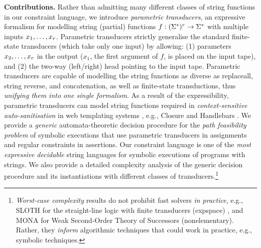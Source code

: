 
\smallskip
\noindent
\textbf{Contributions.} Rather than admitting many different classes of string 
functions in our constraint language, we introduce \emph{parametric 
transducers}, an expressive formalism for modelling string (partial) functions 
$f: (\Sigma^*)^r \to \Sigma^*$ with multiple inputs $x_1,\ldots, 
x_r$. Parametric
transducers strictly generalise the standard finite-state transducers (which take only
one input) by allowing: (1) parameters $x_2,\ldots,x_r$ in the output
($x_1$, the first argument of $f$, is placed on the input tape), 
and (2) the two-way (left/right) head pointing to the input tape. 
Parametric transducers are capable of modelling the string functions as 
diverse as replaceall, string reverse, and concatenation, as well as finite-state transductions, thus \emph{unifying them into one single formalism}.
As a result of the expressibility, parametric transducers can model string functions required in \emph{context-sensitive
auto-sanitisation} in web templating systems \cite{SSS11}, e.g., Closure 
\cite{Closure} and Handlebars \cite{Handlebars}. 
We provide a \emph{generic} automata-theoretic decision procedure for the \emph{path 
feasibility problem} of symbolic executions that use parametric transducers in 
assignments and regular constraints in assertions. Our constraint language
is one of the \emph{most expressive decidable} string languages for symbolic 
executions of programs with strings.
%
We also provide a detailed complexity 
analysis of the generic decision procedure and its instantiations with different classes of transducers.\footnote{
\emph{Worst-case complexity} results  do not prohibit fast solvers 
\emph{in practice}, e.g., SLOTH for the straight-line 
logic with finite transducers ({\sc expspace}) 
\cite{HJLRV18}, and MONA for Weak Second-Order
Theory of Successors ({\sc nonelementary}). Rather, they
\emph{inform} algorithmic techniques that could work in practice, e.g., 
symbolic techniques.}
%
